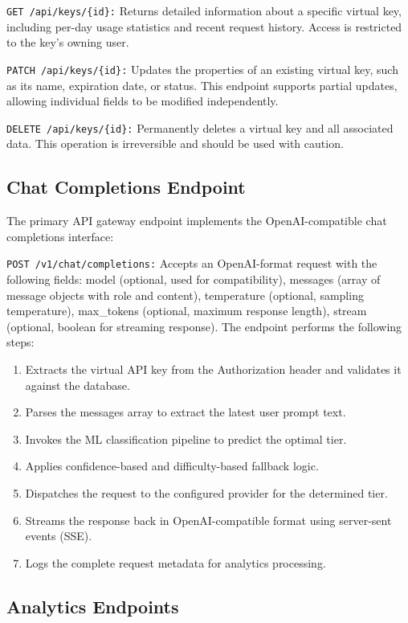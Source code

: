 \documentclass[oneside,12pt,a4paper]{report}
\begin{document}
\texttt{GET /api/keys/\{id\}:} Returns detailed information about a specific virtual key, including per-day usage statistics and recent request history. Access is restricted to the key's owning user.

\texttt{PATCH /api/keys/\{id\}:} Updates the properties of an existing virtual key, such as its name, expiration date, or status. This endpoint supports partial updates, allowing individual fields to be modified independently.

\texttt{DELETE /api/keys/\{id\}:} Permanently deletes a virtual key and all associated data. This operation is irreversible and should be used with caution.

\subsection{Chat Completions Endpoint}

The primary API gateway endpoint implements the OpenAI-compatible chat completions interface:

\texttt{POST /v1/chat/completions:} Accepts an OpenAI-format request with the following fields: model (optional, used for compatibility), messages (array of message objects with role and content), temperature (optional, sampling temperature), max\_tokens (optional, maximum response length), stream (optional, boolean for streaming response). The endpoint performs the following steps:

\begin{enumerate}
  \item Extracts the virtual API key from the Authorization header and validates it against the database.
  \item Parses the messages array to extract the latest user prompt text.
  \item Invokes the ML classification pipeline to predict the optimal tier.
  \item Applies confidence-based and difficulty-based fallback logic.
  \item Dispatches the request to the configured provider for the determined tier.
  \item Streams the response back in OpenAI-compatible format using server-sent events (SSE).
  \item Logs the complete request metadata for analytics processing.
\end{enumerate}

\subsection{Analytics Endpoints}
\end{document}
